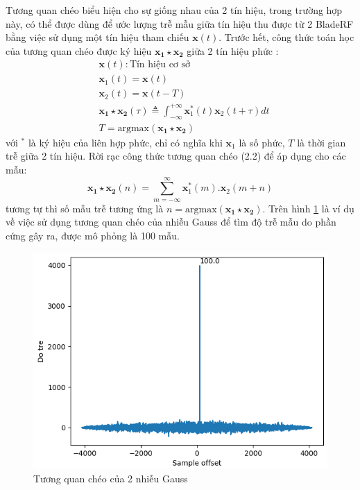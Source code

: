 Tương quan chéo biểu hiện cho sự giống nhau của 2 tín hiệu, trong trường hợp này, có thể được dùng để ước lượng trễ mẫu giữa tín hiệu thu được từ 2 BladeRF bằng việc sử dụng một tín hiệu tham chiếu $\mathbf{x}(t)$. Trước hết, công thức toán học của tương quan chéo được ký hiệu $\mathbf{x_1 \star x_2}$ giữa 2 tín hiệu phức \cite{Bracewell1978}:
\begin{equation}
\begin{split}
&\mathbf{x}(t): \textrm{Tín hiệu cơ sở}\\
&\mathbf{x}_1(t) =\mathbf{x}(t)\\
&\mathbf{x}_2(t) =\mathbf{x}(t - T) \\
&\mathbf{x_1 \star x_2}(\tau) \triangleq \int_{-\infty}^{+\infty} \mathbf{x}_{1}^{*} (t) \mathbf{x}_{2} (t + \tau) dt \\
&T =\textrm{argmax}(\mathbf{x_1 \star x_2})
\end{split}
\end{equation}
với $^*$ là ký hiệu của liên hợp phức, chỉ có nghĩa khi $\mathbf{x}_1$ là số phức, $T$  là thời gian trễ giữa 2 tín hiệu. Rời rạc công thức tương quan chéo (2.2) để áp dụng cho các mẫu:
\begin{equation}
\mathbf{x_1 \star x_2}(n) = \sum_{m = -\infty}^{\infty} \mathbf{x}^*_1 (m) .\mathbf{x}_2 (m + n)
\end{equation}
tương tự thì số mẫu trễ tương ứng là $n = \mathrm{argmax(\mathbf{x_1 \star x_2})}$. Trên hình \ref{fig:xcorr} là ví dụ về việc sử dụng tương quan chéo của nhiễu Gauss để tìm độ trễ mẫu do phần cứng gây ra, được mô phỏng là 100 mẫu. 
\begin{figure} [!h]
	\centering
	\includegraphics[width=0.8\linewidth]{figures/xcorr.png}
	\caption{Tương quan chéo của 2 nhiễu Gauss}
	\label{fig:xcorr}
\end{figure}

